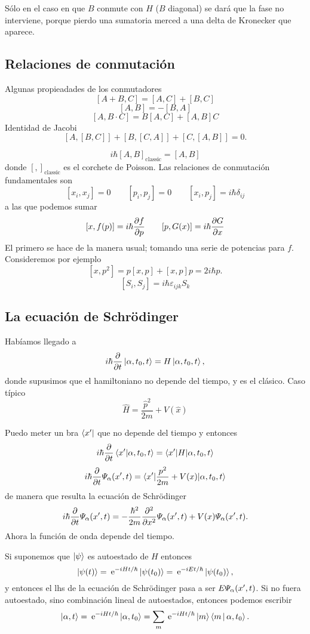 \documentclass[10pt,oneside]{CBFT_book}
\begin{document}
Sólo en el caso en que $B$ conmute con $H$ ($B$ diagonal) se dará que la fase no interviene,
porque pierdo una sumatoria merced a una delta de Kronecker que aparece.

\subsection{Relaciones de conmutación}

Algunas propieadades de los conmutadores
\[
	[ A + B, C] = [A, C] + [B,C] 
\]
\[
	[A, B] = - [B,A]
\]
\[
	[A, B\cdot C] = B[A,C] +  [A,B]C
\]
Identidad de Jacobi
\[
	[ A, [B,C] ] +  [ B, [C,A] ] + [ C, [A,B] ] = 0.
\]

\[
	i\hbar[ A, B]_{\text{classic}} = [A, B]
\]
donde $[ , ]_{\text{classic}}$ es el corchete de Poisson.
Las relaciones de conmutación fundamentales son 
\[
	[x_i, x_j] = 0 \qquad [p_i, p_j]=0 \qquad [x_i,p_j] =i\hbar\delta_{ij}
\]
a las que podemos sumar
\[
	[x,f(p)] = i\hbar\dpar{f}{p} \qquad [p,G(x)] = i\hbar\dpar{G}{x} 
\]
El primero se hace de la manera usual; tomando una serie de potencias para $f$.
Consideremos por ejemplo
\[
	[x,p^2] = p[x,p] + [x,p]p = 2 i \hbar p.
\]
\[
	[S_i,S_j] = i\hbar \varepsilon_{ijk}S_k
\]

\subsection{La ecuación de Schrödinger}

Habíamos llegado a
\[
	i\hbar\dpar{}{t}\Ket{\alpha,t_0,t} = H\Ket{\alpha,t_0,t},
\]
donde supusimos que el hamiltoniano no depende del tiempo, y es el clásico. Caso típico
\[
	\hat{H} = \frac{\hat{p}^2}{2m} + V(\hat{x}) 
\]

Puedo meter un bra $\Bra{x'}$ que no depende del tiempo y entonces 
\[
	i\hbar\dpar{}{t}\braket{x'|\alpha,t_0,t} = \braket{x'|H|\alpha,t_0,t}
\]
\[
	i\hbar\dpar{}{t}\Psi_\alpha(x',t) = \braket{x'|\frac{p^2}{2m} + V(x)|\alpha,t_0,t}
\]
de manera que resulta la ecuación de Schrödinger
\[
	i\hbar\dpar{}{t}\Psi_\alpha(x',t) = -\frac{\hbar^2}{2m}\dpar[2]{}{x}\Psi_\alpha(x',t) + 
	V(x)\Psi_\alpha(x',t).
\]
Ahora la función de onda depende del tiempo.

Si suponemos que $\Ket{\psi}$ es autoestado de $H$ entonces
\[
	\Ket{\psi(t)} = \euler^{-iHt/\hbar} \Ket{\psi(t_0)} = \euler^{-iEt/\hbar} \Ket{\psi(t_0)},
\]
y entonces el lhs de la ecuación de Schrödinger pasa a ser $E \Psi_\a(x',t)$.
Si no fuera autoestado, sino combinación lineal de autoestados, entonces podemos escribir
\[
	\Ket{\a,t} =  \euler^{-iHt/\hbar} \Ket{\a,t_0} = 
	\sum_m \euler^{-iHt/\hbar} \Ket{m}\Braket{m|\a,t_0}.
\]
\end{document}
